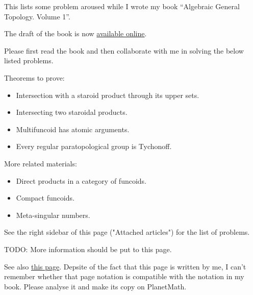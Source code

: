 \documentclass[12pt]{article}
\begin{document}
This lists some problem aroused while I wrote my book ``Algebraic General Topology. Volume 1''.

The draft of the book is now \href{http://www.mathematics21.org/algebraic-general-topology.html}{available online}.

Please first read the book and then collaborate with me in solving the below listed problems.

Theorems to prove:
\begin{itemize}
\item Intersection with a staroid product through its upper sets.
\item Intersecting two staroidal products.
\item Multifuncoid has atomic arguments.
\item Every regular paratopological group is Tychonoff.
\end{itemize}

More related materials:
\begin{itemize}
\item Direct products in a category of funcoids.
\item Compact funcoids.
\item Meta-singular numbers.
\end{itemize}

See the right sidebar of this page ("Attached articles") for the list of problems.

TODO: More information should be put to this page.

See also \href{http://researchtrends.wikia.com/wiki/Cartesian_closed_categories_containing_Top_and_Prox_as_subcategories}{this page}. Depsite of the fact that this page is written by me, I can't remember whether that page notation is compatible with the notation in my book. Please analyse it and make its copy on PlanetMath.
\end{document}
